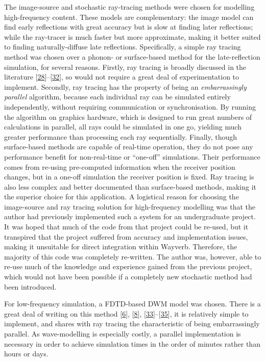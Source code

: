 \documentclass[]{scrreprt}
\begin{document}
The image-source and stochastic ray-tracing methods were chosen for
modelling high-frequency content. These models are complementary: the
image model can find early reflections with great accuracy but is slow
at finding later reflections; while the ray-tracer is much faster but
more approximate, making it better suited to finding naturally-diffuse
late reflections. Specifically, a simple ray tracing method was chosen
over a phonon- or surface-based method for the late-reflection
simulation, for several reasons. Firstly, ray tracing is broadly
discussed in the literature
{[}\protect\hyperlink{ref-krokstadux5fcalculatingux5f1968}{28}{]}--{[}\protect\hyperlink{ref-alpkocakux5fcomputingux5f2010}{32}{]},
so would not require a great deal of experimentation to implement.
Secondly, ray tracing has the property of being an \emph{embarrassingly
parallel} algorithm, because each individual ray can be simulated
entirely independently, without requiring communication or
synchronisation. By running the algorithm on graphics hardware, which is
designed to run great numbers of calculations in parallel, all rays
could be simulated in one go, yielding much greater performance than
processing each ray sequentially. Finally, though surface-based methods
are capable of real-time operation, they do not pose any performance
benefit for non-real-time or ``one-off'' simulations. Their performance
comes from re-using pre-computed information when the receiver position
changes, but in a one-off simulation the receiver position is fixed. Ray
tracing is also less complex and better documented than surface-based
methods, making it the superior choice for this application. A
logistical reason for choosing the image-source and ray tracing solution
for high-frequency modelling was that the author had previously
implemented such a system for an undergraduate project. It was hoped
that much of the code from that project could be re-used, but it
transpired that the project suffered from accuracy and implementation
issues, making it unsuitable for direct integration within Wayverb.
Therefore, the majority of this code was completely re-written. The
author was, however, able to re-use much of the knowledge and experience
gained from the previous project, which would not have been possible if
a completely new stochastic method had been introduced.

For low-frequency simulation, a FDTD-based DWM model was chosen. There
is a great deal of writing on this method
{[}\protect\hyperlink{ref-murphyux5fdigitalux5f2000}{6}{]},
{[}\protect\hyperlink{ref-camposux5fcomputationalux5f2005}{8}{]},
{[}\protect\hyperlink{ref-vanux5fduyneux5f3dux5f1996}{33}{]}--{[}\protect\hyperlink{ref-kowalczykux5froomux5f2011}{35}{]},
it is relatively simple to implement, and shares with ray tracing the
characteristic of being embarrassingly parallel. As wave-modelling is
especially costly, a parallel implementation is necessary in order to
achieve simulation times in the order of minutes rather than hours or
days.
\end{document}

